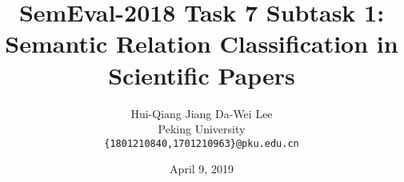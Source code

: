 \documentclass[12pt, a4paper]{article}
\title{SemEval-2018 Task 7 Subtask 1: Semantic Relation Classification in Scientific Papers}
\author{Hui-Qiang Jiang \quad Da-Wei Lee \\
Peking University \\
{\tt \{1801210840,1701210963\}@pku.edu.cn}}
\date{April 9, 2019}
\begin{document}
\maketitle
\begin{abstract}
  
\end{abstract}










\end{document}
